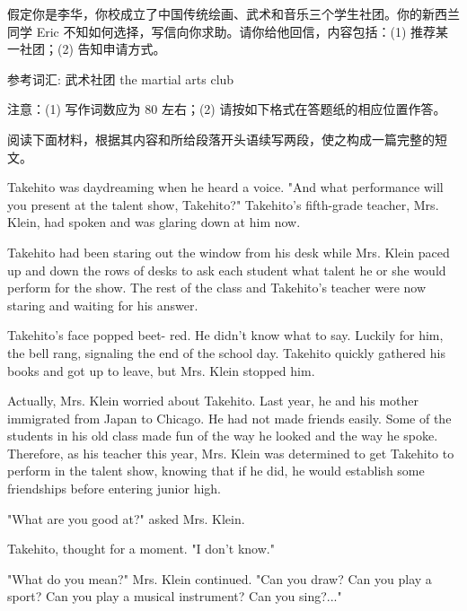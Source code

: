 \documentclass{英语试卷}
\begin{document}
\par 假定你是李华，你校成立了中国传统绘画、武术和音乐三个学生社团。你的新西兰同学 Eric 不知如何选择，写信向你求助。请你给他回信，内容包括：(1) 推荐某一社团；(2) 告知申请方式。\par
\par 参考词汇: 武术社团 the martial arts club\par
\par 注意：(1) 写作词数应为 80 左右；(2) 请按如下格式在答题纸的相应位置作答。\par
{}
\par 阅读下面材料，根据其内容和所给段落开头语续写两段，使之构成一篇完整的短文。\par
\par Takehito was daydreaming when he heard a voice. "And what performance will you present at the talent show, Takehito?" Takehito's fifth-grade teacher, Mrs. Klein, had spoken and was glaring down at him now.\par
\par Takehito had been staring out the window from his desk while Mrs. Klein paced up and down the rows of desks to ask each student what talent he or she would perform for the show. The rest of the class and Takehito's teacher were now staring and waiting for his answer.\par
\par Takehito's face popped beet- red. He didn't know what to say. Luckily for him, the bell rang, signaling the end of the school day. Takehito quickly gathered his books and got up to leave, but Mrs. Klein stopped him.\par
\par Actually, Mrs. Klein worried about Takehito. Last year, he and his mother immigrated from Japan to Chicago. He had not made friends easily. Some of the students in his old class made fun of the way he looked and the way he spoke. Therefore, as his teacher this year, Mrs. Klein was determined to get Takehito to perform in the talent show, knowing that if he did, he would establish some friendships before entering junior high.\par
\par "What are you good at?" asked Mrs. Klein.\par
\par Takehito, thought for a moment. "I don't know."\par
\par "What do you mean?" Mrs. Klein continued. "Can you draw? Can you play a sport? Can you play a musical instrument? Can you sing?..."\par
\end{document}
